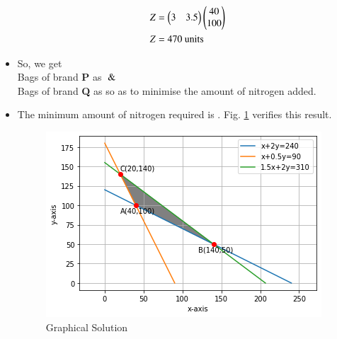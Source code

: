 \begin{itemize}
\begin{align}
   Z &= \begin{pmatrix}3&3.5\end{pmatrix}\begin{pmatrix}40 \\ 100\end{pmatrix} \\
    Z&= 470 \text{ units}
\end{align}
\item So, we get
\\
 Bags of brand \textbf{P} as  $\And$
 \\
 Bags of brand \textbf{Q} as   so as to minimise the amount of nitrogen added.
\item The minimum amount of nitrogen required is  .  Fig. \ref{opt/30/fig}
verifies this result.
%
\begin{figure}[!ht]
\centering
\includegraphics[width=\columnwidth]{solutions/su2021/2/30/Graphical_Solution_2.30.png}
\caption{Graphical Solution}
\label{opt/30/fig}
\end{figure}

\end{itemize}

